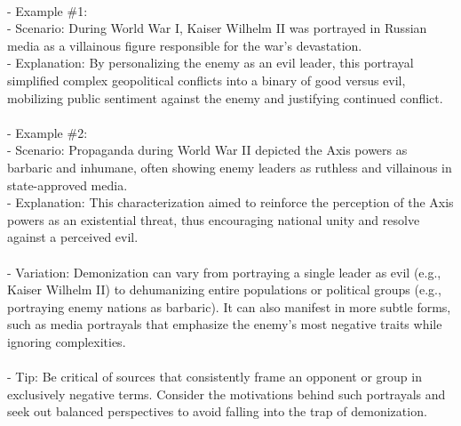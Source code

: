 \documentclass[a4paper,12pt,single,pdftex]{scrartcl}
\begin{document}
{    \\

    
      - Example \#1:
    \\

    
        - Scenario: During World War I, Kaiser Wilhelm II was portrayed in Russian media as a villainous figure responsible for the war's devastation.
    \\

    
        - Explanation: By personalizing the enemy as an evil leader, this portrayal simplified complex geopolitical conflicts into a binary of good versus evil, mobilizing public sentiment against the enemy and justifying continued conflict.
    \\

    
      
    \\

    
      - Example \#2:
    \\

    
        - Scenario: Propaganda during World War II depicted the Axis powers as barbaric and inhumane, often showing enemy leaders as ruthless and villainous in state-approved media.
    \\

    
        - Explanation: This characterization aimed to reinforce the perception of the Axis powers as an existential threat, thus encouraging national unity and resolve against a perceived evil.
    \\

    
      
    \\

    
      - Variation: Demonization can vary from portraying a single leader as evil (e.g., Kaiser Wilhelm II) to dehumanizing entire populations or political groups (e.g., portraying enemy nations as barbaric). It can also manifest in more subtle forms, such as media portrayals that emphasize the enemy's most negative traits while ignoring complexities.
    \\

    
      
    \\

    
      - Tip: Be critical of sources that consistently frame an opponent or group in exclusively negative terms. Consider the motivations behind such portrayals and seek out balanced perspectives to avoid falling into the trap of demonization.
    \\

}
\end{document}
